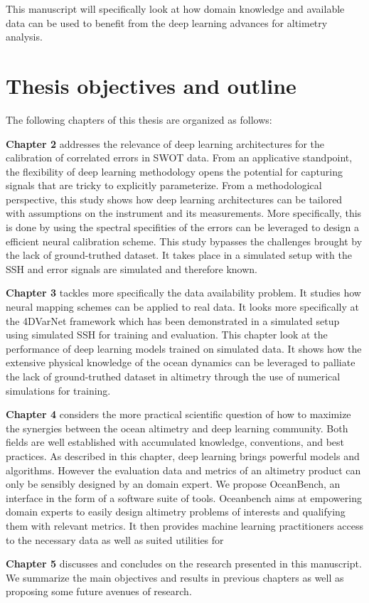 \begin{bibunit}
This manuscript will specifically look at how domain knowledge and available data can be used to benefit from the deep learning advances for altimetry analysis.



\section{Thesis objectives and outline}

The following chapters of this thesis are organized as follows:

\textbf{Chapter 2} addresses the relevance of deep learning architectures for the calibration of correlated errors in SWOT data.
From an applicative standpoint, the flexibility of deep learning methodology opens the potential for capturing signals that are tricky to explicitly parameterize.
From a methodological perspective, this study shows how deep learning architectures can be tailored with assumptions on the instrument and its measurements.
More specifically, this is done by using the spectral specifities of the errors can be leveraged to design a efficient neural calibration scheme.
This study bypasses the challenges brought by the lack of ground-truthed dataset.
It takes place in a simulated setup with the SSH and error signals are simulated and therefore known.


\textbf{Chapter 3} tackles more specifically the data availability problem. It studies how neural mapping schemes can be applied to real data.
It looks more specifically at the 4DVarNet\cite{} framework which has been demonstrated in a simulated setup\cite{} using simulated SSH for training and evaluation.
This chapter look at the performance of deep learning models trained on simulated data.
It shows how the extensive physical knowledge of the ocean dynamics can be leveraged to palliate the lack of ground-truthed dataset in altimetry through the use  of numerical simulations for training.

\textbf{Chapter 4} considers the more practical scientific question of how to maximize the synergies between the ocean altimetry and deep learning community.
Both fields are well established with accumulated knowledge, conventions, and best practices. 
As described in this chapter, deep learning brings powerful models and algorithms.
However the evaluation data and metrics of an altimetry product can only be sensibly designed by an domain expert. 
We propose OceanBench, an interface in the form of a software suite of tools.
Oceanbench aims at empowering domain experts to easily design altimetry problems of interests and qualifying them with relevant metrics. 
It then provides machine learning practitioners access to the necessary data as well as suited utilities for 

\textbf{Chapter 5} discusses and concludes on the research presented in this manuscript. We summarize the main objectives and results in previous chapters as well as proposing some future avenues of research.
 
\end{bibunit}

